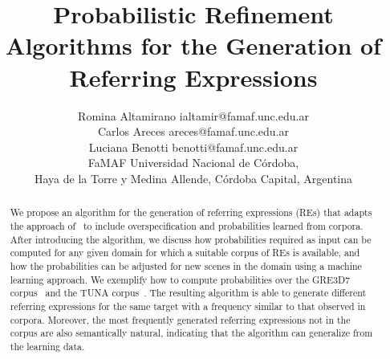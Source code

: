 \documentclass[jair,twoside,11pt,theapa]{article}
\begin{document}
\title{Probabilistic Refinement Algorithms
for the Generation of Referring Expressions}

\author{\name Romina Altamirano \email ialtamir@famaf.unc.edu.ar \\
       \name Carlos Areces \email areces@famaf.unc.edu.ar \\
       \name Luciana Benotti \email benotti@famaf.unc.edu.ar \\ 
       \addr FaMAF Universidad Nacional de C\'ordoba, \\
       Haya de la Torre y Medina Allende, C\'ordoba Capital, Argentina
}


\maketitle


\begin{abstract}
We propose an algorithm for the generation of referring expressions (REs) that adapts the approach of~ 
to include overspecification and probabilities learned from corpora.  After introducing the algorithm, we discuss how probabilities required as 
input can be computed for any given domain for which a suitable corpus of REs is available, and how the probabilities can be adjusted for new scenes in the domain using a machine learning approach.  
We exemplify how to compute probabilities over the GRE3D7 corpus~ and the TUNA corpus~.
The resulting algorithm is able to generate different referring expressions for the same target with a frequency similar to that observed in corpora. Moreover, the most frequently generated referring expressions not in the corpus are also semantically natural, indicating that the algorithm can generalize from the learning data. 
\end{abstract}













\end{document}
